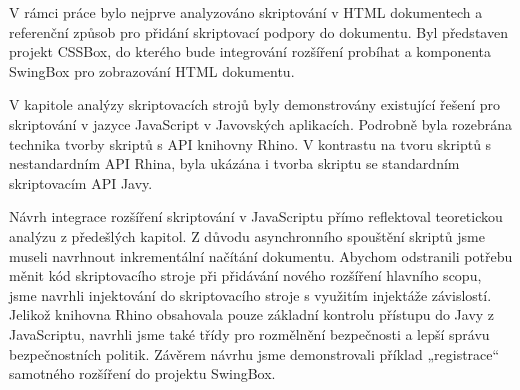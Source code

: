 V rámci práce bylo nejprve analyzováno skriptování v HTML dokumentech a referenční způsob pro přidání skriptovací podpory do dokumentu. Byl představen projekt CSSBox, do kterého bude integrování rozšíření probíhat a komponenta SwingBox pro zobrazování HTML dokumentu.

V kapitole analýzy skriptovacích strojů byly demonstrovány existující řešení pro skriptování v jazyce JavaScript v Javovských aplikacích. Podrobně byla rozebrána technika tvorby skriptů s API knihovny Rhino. V kontrastu na tvoru skriptů s nestandardním API Rhina, byla ukázána i tvorba skriptu se standardním skriptovacím API Javy.

Návrh integrace rozšíření skriptování v JavaScriptu přímo reflektoval teoretickou analýzu z předešlých kapitol. Z důvodu asynchronního spouštění skriptů jsme museli navrhnout inkrementální načítání dokumentu. Abychom odstranili potřebu měnit kód skriptovacího stroje při přidávání nového rozšíření hlavního scopu, jsme navrhli injektování do skriptovacího stroje s využitím injektáže závislostí. Jelikož knihovna Rhino obsahovala pouze základní kontrolu přístupu do Javy z JavaScriptu, navrhli jsme také třídy pro rozmělnění bezpečnosti a lepší správu bezpečnostních politik. Závěrem návrhu jsme demonstrovali příklad „registrace“ samotného rozšíření do projektu SwingBox.

